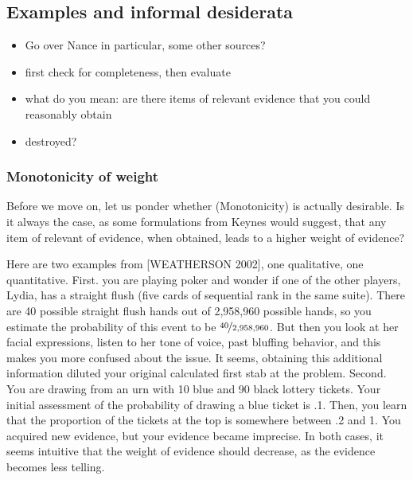 \documentclass[
  10pt,
  dvipsnames,enabledeprecatedfontcommands]{scrartcl}
\begin{document}
\hypertarget{examples-and-informal-desiderata}{%
\subsection{Examples and informal
desiderata}\label{examples-and-informal-desiderata}}

\begin{itemize}
\item
  Go over Nance in particular, some other sources?
\item
  first check for completeness, then evaluate
\item
  what do you mean: are there items of relevant evidence that you could
  reasonably obtain
\item
  destroyed?
\end{itemize}

\hypertarget{monotonicity-of-weight}{%
\subsubsection{Monotonicity of weight}\label{monotonicity-of-weight}}

Before we move on, let us ponder whether (Monotonicity) is actually
desirable. Is it always the case, as some formulations from Keynes would
suggest, that any item of relevant of evidence, when obtained, leads to
a higher weight of evidence?

Here are two examples from {[}WEATHERSON 2002{]}, one qualitative, one
quantitative.\todo{CITE B. Weatherson. Keynes, uncertainty and interest rates. Cambridge Journal of Eco-
nomics, 26 (1): 47-62, 2002.]} First. you are playing poker and wonder
if one of the other players, Lydia, has a straight flush (five cards of
sequential rank in the same suite). There are 40 possible straight flush
hands out of 2,958,960 possible hands, so you estimate the probability
of this event to be \(\nicefrac{40}{2,958,960}\). But then you look at
her facial expressions, listen to her tone of voice, past bluffing
behavior, and this makes you more confused about the issue. It seems,
obtaining this additional information diluted your original calculated
first stab at the problem. Second. You are drawing from an urn with 10
blue and 90 black lottery tickets. Your initial assessment of the
probability of drawing a blue ticket is .1. Then, you learn that the
proportion of the tickets at the top is somewhere between .2 and 1. You
acquired new evidence, but your evidence became imprecise. In both
cases, it seems intuitive that the weight of evidence should decrease,
as the evidence becomes less telling.
\end{document}
